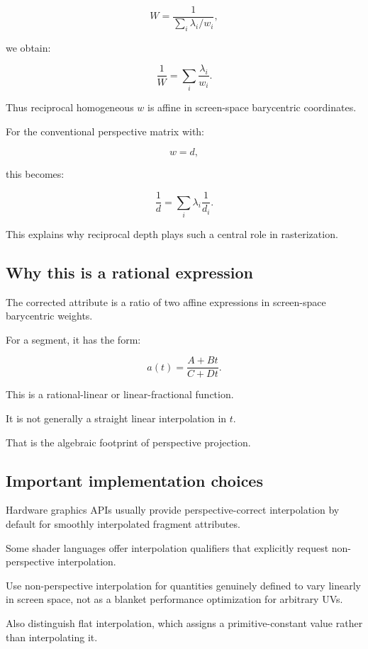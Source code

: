 \[
 W=\frac1{\sum_i\lambda_i/w_i},
\]

we obtain:

\[
 \boxed{ \frac1W= \sum_i\frac{\lambda_i}{w_i} }.
\]

Thus reciprocal homogeneous \(w\) is affine in screen-space barycentric coordinates.

For the conventional perspective matrix with:

\[
 w=d,
\]

this becomes:

\[
 \boxed{ \frac1d= \sum_i\lambda_i\frac1{d_i} }.
\]

This explains why reciprocal depth plays such a central role in rasterization.

\subsection{Why this is a rational expression}\label{02-foundations-ii-ch034-why-this-is-a-rational-expression}

The corrected attribute is a ratio of two affine expressions in screen-space barycentric weights.

For a segment, it has the form:

\[
 a(t)= \frac{A+Bt}{C+Dt}.
\]

This is a rational-linear or linear-fractional function.

It is not generally a straight linear interpolation in \(t\).

That is the algebraic footprint of perspective projection.

\subsection{Important implementation choices}\label{02-foundations-ii-ch034-important-implementation-choices}

Hardware graphics APIs usually provide perspective-correct interpolation by default for smoothly interpolated fragment attributes.

Some shader languages offer interpolation qualifiers that explicitly request non-perspective interpolation.

Use non-perspective interpolation for quantities genuinely defined to vary linearly in screen space, not as a blanket performance optimization for arbitrary UVs.

Also distinguish flat interpolation, which assigns a primitive-constant value rather than interpolating it.

